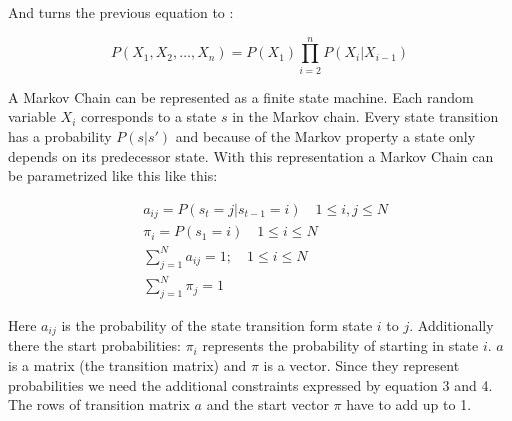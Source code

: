 And turns the previous equation to :

\begin{equation}
P\left(X_{1}, X_{2}, \ldots, X_{n}\right)=P\left(X_{1}\right) \prod_{i=2}^{n} P\left(X_{i} | X_{i-1}\right)
\end{equation}

A Markov Chain can be represented as a finite state machine. Each random variable $X_i$ corresponds to a state $s$ in the Markov chain. Every state transition has a probability $P(s | s')$ and because of the Markov property a state only depends on its predecessor state. With this representation a Markov Chain can be parametrized like this like this:

\begin{equation}
\begin{aligned}
&a_{i j}=P\left(s_{t}=j | s_{t-1}=i\right) \quad 1 \leq i, j \leq N \\
&\pi_{i}=P\left(s_{1}=i\right) \quad 1 \leq i \leq N \\
&\sum_{j=1}^{N} a_{i j}=1 ; \quad 1 \leq i \leq N \\
&\sum_{j=1}^{N} \pi_{j}=1
\end{aligned}
\end{equation}

Here $a_{ij}$ is the probability of the state transition form state $i$ to $j$. Additionally there the start probabilities: $\pi_i$ represents the probability of starting in state $i$. $a$ is a matrix (the transition matrix) and $\pi$ is a vector. Since they represent probabilities we need the additional constraints expressed by equation 3 and 4. The rows of transition matrix $a$ and the start vector $\pi$ have to add up to 1. \parencite{huang2001spoken}

